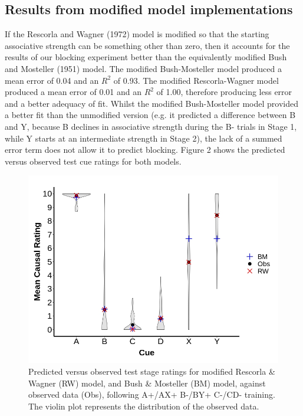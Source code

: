 \documentclass[twocolumn]{article}
\begin{document}
\subsection{Results from modified model implementations}

If the Rescorla and Wagner (1972) model is modified so that the starting
associative strength can be something other than zero, then it accounts
for the results of our blocking experiment better than the equivalently
modified Bush and Mosteller (1951) model. The modified Bush-Mosteller
model produced a mean error of 0.04 and an $R^2$ of 0.93.
The modified Rescorla-Wagner model produced a mean error of 0.01 and an
$R^2$ of 1.00, therefore producing less error and a
better adequacy of fit. Whilst the modified Bush-Mosteller model
provided a better fit than the unmodified version (e.g. it predicted a
difference between B and Y, because B declines in associative strength
during the B- trials in Stage 1, while Y starts at an intermediate
strength in Stage 2), the lack of a summed error term does not allow it
to predict blocking. Figure 2 shows the predicted versus observed test
cue ratings for both models.

\begin{figure}[t!]
\includegraphics[width=\columnwidth]{fig2.jpg}
\caption{Predicted versus observed test
stage ratings for modified Rescorla \& Wagner (RW) model, and Bush \&
Mosteller (BM) model, against observed data (Obs), following A+/AX+
B-/BY+ C-/CD- training. The violin plot represents the distribution of
the observed data.}
\end{figure}
\end{document}
